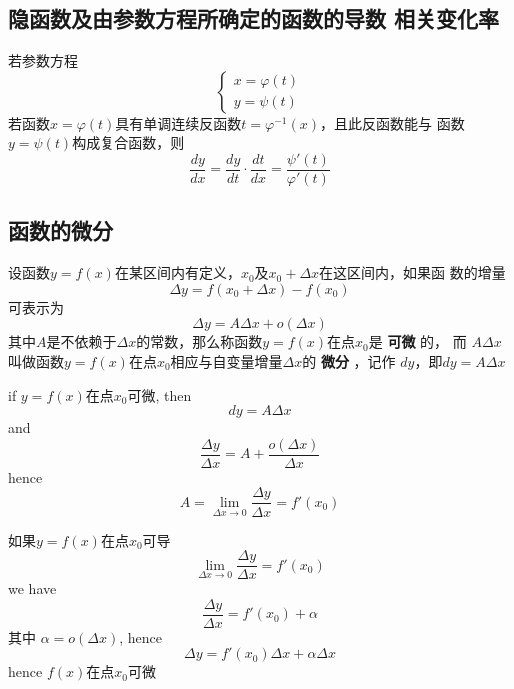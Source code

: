 \documentclass[11pt]{article}
\begin{document}
\subsection{隐函数及由参数方程所确定的函数的导数 相关变化率}
\label{sec:org0596f80}

若参数方程
\begin{equation*}
\begin{cases}
x=\varphi(t)\\
y=\psi(t)
\end{cases}
\end{equation*}
若函数\(x=\varphi(t)\)具有单调连续反函数\(t=\varphi^{-1}(x)\)，且此反函数能与
函数\(y=\psi(t)\)构成复合函数，则
\begin{equation*}
\frac{dy}{dx}=\frac{dy}{dt}\cdot\frac{dt}{dx}=\frac{\psi'(t)}{\varphi'(t)}
\end{equation*}
\subsection{函数的微分}
\label{sec:org1dbe737}
\begin{definition}[]
设函数\(y=f(x)\)在某区间内有定义，\(x_0\)及\(x_0+\Delta x\)在这区间内，如果函
数的增量
\begin{equation*}
\Delta y=f(x_0+\Delta x)-f(x_0)
\end{equation*}
可表示为
\begin{equation*}
\Delta y=A\Delta x+o(\Delta x)
\end{equation*}
其中\(A\)是不依赖于\(\Delta x\)的常数，那么称函数\(y=f(x)\)在点\(x_0\)是 \textbf{可微} 的，
而 \(A\Delta x\) 叫做函数\(y=f(x)\)在点\(x_0\)相应与自变量增量\(\Delta x\)的 \textbf{微分}
，记作 \(dy\)，即\(dy=A\Delta x\)
\end{definition}

if \(y=f(x)\)在点\(x_0\)可微, then
\begin{equation*}
dy=A\Delta x
\end{equation*}
and
\begin{equation*}
\frac{\Delta y}{\Delta x}=A+\frac{o(\Delta x)}{\Delta x}
\end{equation*}
hence
\begin{equation*}
A=\lim_{\Delta x\to0}\frac{\Delta y}{\Delta x}=f'(x_0)
\end{equation*}

如果\(y=f(x)\)在点\(x_0\)可导
\begin{equation*}
\lim_{\Delta x\to0}\frac{\Delta y}{\Delta x}=f'(x_0)
\end{equation*}
we have
\begin{equation*}
\frac{\Delta y}{\Delta x}=f'(x_0)+\alpha
\end{equation*}
其中 \(\alpha=o(\Delta x)\), hence
\begin{equation*}
\Delta y=f'(x_0)\Delta x+\alpha\Delta x
\end{equation*}
hence \(f(x)\)在点\(x_0\)可微
\end{document}
